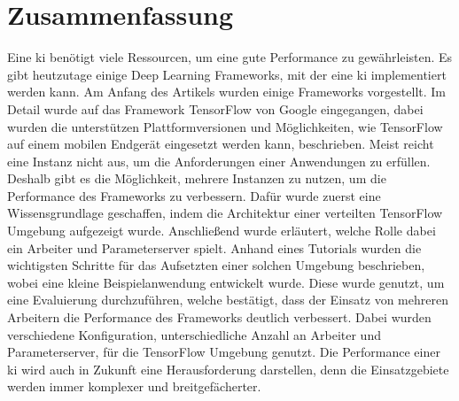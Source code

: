 \section{Zusammenfassung}
 Eine \ac{ki} benötigt viele Ressourcen, um eine gute Performance zu gewährleisten. Es gibt heutzutage einige Deep Learning Frameworks, mit der eine \ac{ki} implementiert werden kann. Am Anfang des Artikels wurden einige Frameworks vorgestellt. Im Detail wurde auf das Framework TensorFlow von
 Google eingegangen, dabei wurden die unterstützen Plattformversionen und Möglichkeiten, wie TensorFlow auf einem mobilen Endgerät eingesetzt werden kann, beschrieben. Meist reicht eine Instanz nicht aus, um die Anforderungen einer Anwendungen zu erfüllen. Deshalb gibt es die Möglichkeit, mehrere Instanzen zu nutzen, um die Performance des Frameworks zu verbessern. Dafür wurde zuerst eine Wissensgrundlage geschaffen, indem die Architektur einer verteilten TensorFlow Umgebung aufgezeigt wurde. Anschließend wurde erläutert, welche Rolle dabei ein Arbeiter und Parameterserver spielt. Anhand eines Tutorials wurden die wichtigsten Schritte für das Aufsetzten einer solchen Umgebung beschrieben, wobei eine kleine Beispielanwendung entwickelt wurde. Diese wurde genutzt, um eine Evaluierung durchzuführen, welche bestätigt, dass der Einsatz von mehreren
 Arbeitern die Performance des Frameworks deutlich verbessert. Dabei wurden verschiedene Konfiguration, unterschiedliche Anzahl an Arbeiter und Parameterserver, für die TensorFlow Umgebung genutzt. Die Performance einer \ac{ki} wird auch in Zukunft eine Herausforderung darstellen, denn die Einsatzgebiete werden immer komplexer und breitgefächerter.  